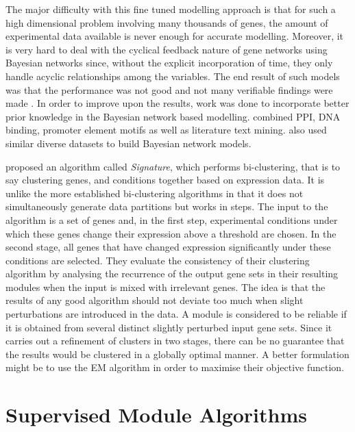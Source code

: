 The major difficulty with this fine tuned modelling approach is that for such a high dimensional problem involving many thousands of genes, the amount of experimental data available is never enough for accurate modelling. Moreover, it is very hard to deal with the cyclical feedback nature of gene networks using Bayesian networks since, without the explicit incorporation of time, they only handle acyclic relationships among the variables. The end result of such models was that the performance was not good and not many verifiable findings were made \citep{husmeier03sensitivity}. In order to improve upon the results, work was done to incorporate better prior knowledge in the Bayesian network based modelling. \citet{imoto03combining} combined PPI, DNA binding, promoter element motifs as well as literature text mining. \citet{tamada03estimating,tamada05utilizing} also used similar diverse datasets to build Bayesian network models. 

\citet{ihmels02revealing} proposed an algorithm called \textit{Signature}, which performs bi-clustering, that is to say clustering genes, and conditions together based on expression data. It is unlike the more established bi-clustering algorithms in that it does not simultaneously generate data partitions but works in steps. The input to the algorithm is a set of genes and, in the first step, experimental conditions under which these genes change their expression above a threshold are chosen. In the second stage, all genes that have changed expression significantly under these conditions are selected. They evaluate the consistency of their clustering algorithm by analysing the recurrence of the output gene sets in their resulting modules when the input is mixed with irrelevant genes. The idea is that the results of any good algorithm should not deviate too much when slight perturbations are introduced in the data. A module is considered to be reliable if it is obtained from several distinct slightly perturbed input gene sets. Since it carries out a refinement of clusters in two stages, there can be no guarantee that the results would be clustered in a globally optimal manner. A better formulation might be to use the \ac{EM} algorithm in order to maximise their objective function. 
 

\section{Supervised Module Algorithms} 

